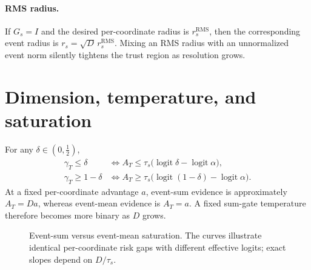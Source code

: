 \documentclass[11pt,a4paper]{article}
\newcommand{\logit}{\operatorname{logit}}
\newcommand{\RMS}{\operatorname{RMS}}
\theoremstyle{plain}
\theoremstyle{definition}
\begin{document}
\paragraph{RMS radius.}
If $G_s=I$ and the desired per-coordinate radius is $r_s^{\RMS}$, then the corresponding event
radius is $r_s=\sqrt D\,r_s^{\RMS}$.  Mixing an RMS radius with an unnormalized event norm silently
tightens the trust region as resolution grows.

\section{Dimension, temperature, and saturation}
\label{sec:scaling}

For any $\delta\in(0,\tfrac12)$,
\begin{align}
\gamma_T\le\delta
&\iff A_T\le\tau_s\bigl(\logit\delta-\logit\alpha\bigr),
\label{eq:low-saturation}\\
\gamma_T\ge1-\delta
&\iff A_T\ge\tau_s\bigl(\logit(1-\delta)-\logit\alpha\bigr).
\label{eq:high-saturation}
\end{align}
At a fixed per-coordinate advantage $a$, event-sum evidence is approximately $A_T=Da$, whereas
event-mean evidence is $A_T=a$.  A fixed sum-gate temperature therefore becomes more binary as
$D$ grows.

\begin{figure}[htbp]
\centering
{}
\caption{Event-sum versus event-mean saturation.  The curves illustrate identical per-coordinate
risk gaps with different effective logits; exact slopes depend on $D/\tau_s$.}
\label{fig:sum-mean}
\end{figure}
\end{document}
